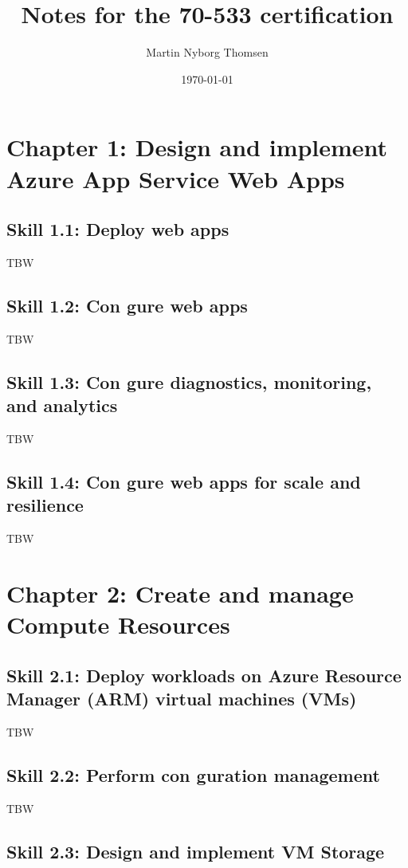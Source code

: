 \documentclass[12pt]{article}
\title{Notes for the 70-533 certification}
\author{Martin Nyborg Thomsen}
\date{\today}
\begin{document}
\maketitle

\section{Chapter 1: Design and implement Azure App Service Web Apps}

\subsection{Skill 1.1: Deploy web apps}
TBW

\subsection{Skill 1.2: Con gure web apps}
TBW

\subsection{Skill 1.3: Con gure diagnostics, monitoring, and analytics}
TBW

\subsection{Skill 1.4: Con gure web apps for scale and resilience}
TBW

\section{Chapter 2: Create and manage Compute Resources}

\subsection{Skill 2.1: Deploy workloads on Azure Resource Manager (ARM) virtual machines (VMs)}
TBW

\subsection{Skill 2.2: Perform con guration management}
TBW

\subsection{Skill 2.3: Design and implement VM Storage}
\end{document}
